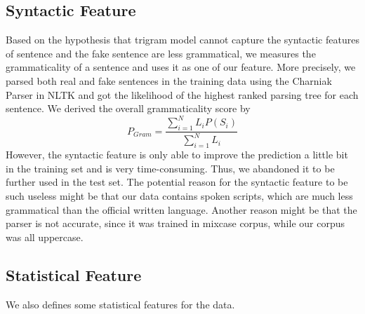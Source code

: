 \begin{itemize}
 
\end{itemize}


\subsection{Syntactic Feature}
Based on the hypothesis that trigram model cannot capture the syntactic features of sentence and the fake sentence are less grammatical, we measures the grammaticality of a sentence and uses it as one of our feature. More precisely, we parsed both real and fake sentences in the training data using the Charniak Parser in NLTK and got the likelihood of the highest ranked parsing tree for each sentence. We derived the overall grammaticality score by 
$$P_{Gram} = \frac{\sum_{i=1}^N L_iP(S_i)}{\sum_{i=1}^N L_i}$$
However, the syntactic feature is only able to improve the prediction a little bit in the training set and is very time-consuming. Thus, we abandoned it to be further used in the test set.
The potential reason for the syntactic feature to be such useless might be that our data contains spoken scripts, which are much less grammatical than the official written language. Another reason might be that the parser is not accurate, since it was trained in mixcase corpus, while our corpus was all uppercase.

\subsection{Statistical Feature}
We also defines some statistical features for the data.

